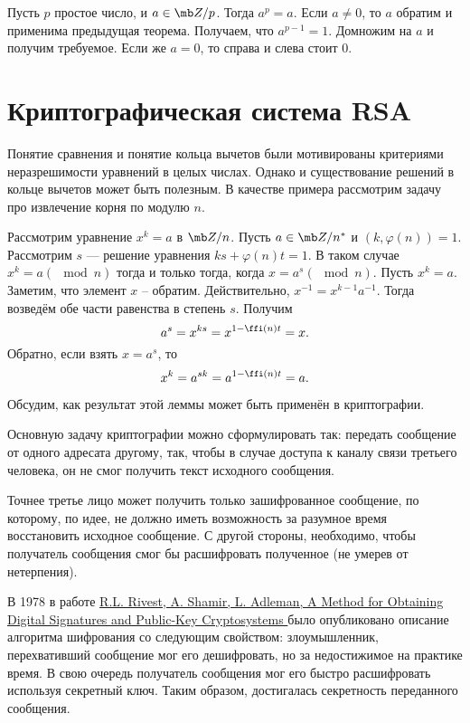  Пусть $p$ простое число, и $a\in \mb Z/p$. Тогда $a^{p} = a$.
\ecrl
\proof Если $a\neq 0$, то $a$ обратим и применима предыдущая теорема. Получаем, что $a^{p-1}=1$. Домножим на $a$ и получим требуемое. Если же $a=0$, то справа и слева стоит 0. 
\endproof






\section{Криптографическая система RSA}
Понятие сравнения и понятие кольца вычетов были мотивированы критериями неразрешимости уравнений в целых числах. Однако и существование решений в кольце вычетов может быть полезным. В качестве примера рассмотрим задачу про извлечение корня по модулю $n$.

\lm Рассмотрим уравнение  $x^k=a$ в $\mb Z/n$. Пусть $a\in \mb Z/n^*$ и $(k,\varphi(n))=1$.
Рассмотрим $s$ ---  решение уравнения $ks+\varphi(n)t=1$. В таком случае $x^k=a (\mod n)$ тогда и только тогда, когда $x=a^s(\mod n)$.
\proof
Пусть $x^k=a$. Заметим, что элемент $x$ -- обратим. Действительно, $x^{-1}=x^{k-1}a^{-1}$. Тогда возведём обе части равенства в степень $s$. Получим 
$$a^s=x^{ks}=x^{1-\ffi(n)t}=x.$$
Обратно, если взять $x=a^s$, то
$$x^k=a^{sk}=a^{1-\ffi(n)t}=a.$$
\endproof
\elm

Обсудим, как результат этой леммы может быть применён в криптографии.

Основную задачу криптографии можно сформулировать так: передать сообщение от одного адресата другому, так, чтобы в случае доступа к каналу связи третьего человека, он не смог получить текст исходного сообщения. 

Точнее третье лицо может получить только зашифрованное сообщение, по которому, по идее, не должно иметь возможность за разумное время восстановить исходное сообщение. С другой стороны, необходимо, чтобы получатель сообщения смог бы расшифровать полученное (не умерев от нетерпения).




В 1978 в работе \href{http://people.csail.mit.edu/rivest/Rsapaper.pdf}{ R.L. Rivest, A. Shamir, L. Adleman, A Method for Obtaining Digital Signatures and Public-Key Cryptosystems } было опубликовано описание алгоритма шифрования со следующим свойством: злоумышленник, перехвативший сообщение мог его дешифровать, но за недостижимое на практике время. В свою очередь получатель сообщения мог его быстро расшифровать используя секретный ключ. Таким образом, достигалась секретность переданного сообщения.



